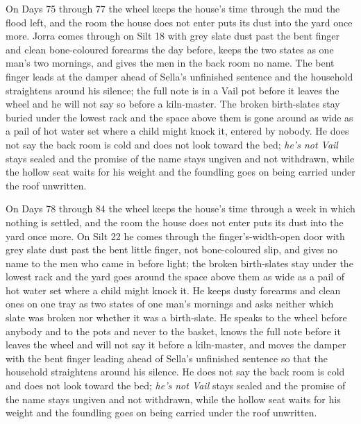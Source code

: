 \documentclass{design/chronicle}
\begin{document}
{On Days 75 through 77 the wheel keeps the house’s time through the mud the flood left, and the room the house does not enter puts its dust into the yard once more. Jorra comes through on Silt 18 with grey slate dust past the bent finger and clean bone-coloured forearms the day before, keeps the two states as one man’s two mornings, and gives the men in the back room no name. The bent finger leads at the damper ahead of Sella’s unfinished sentence and the household straightens around his silence; the full note is in a Vail pot before it leaves the wheel and he will not say so before a kiln-master. The broken birth-slates stay buried under the lowest rack and the space above them is gone around as wide as a pail of hot water set where a child might knock it, entered by nobody. He does not say the back room is cold and does not look toward the bed; \emph{he’s not Vail} stays sealed and the promise of the name stays ungiven and not withdrawn, while the hollow seat waits for his weight and the foundling goes on being carried under the roof unwritten.

On Days 78 through 84 the wheel keeps the house’s time through a week in which nothing is settled, and the room the house does not enter puts its dust into the yard once more. On Silt 22 he comes through the finger’s-width-open door with grey slate dust past the bent little finger, not bone-coloured slip, and gives no name to the men who came in before light; the broken birth-slates stay under the lowest rack and the yard goes around the space above them as wide as a pail of hot water set where a child might knock it. He keeps dusty forearms and clean ones on one tray as two states of one man’s mornings and asks neither which slate was broken nor whether it was a birth-slate. He speaks to the wheel before anybody and to the pots and never to the basket, knows the full note before it leaves the wheel and will not say it before a kiln-master, and moves the damper with the bent finger leading ahead of Sella’s unfinished sentence so that the household straightens around his silence. He does not say the back room is cold and does not look toward the bed; \emph{he’s not Vail} stays sealed and the promise of the name stays ungiven and not withdrawn, while the hollow seat waits for his weight and the foundling goes on being carried under the roof unwritten.

}
\end{document}
